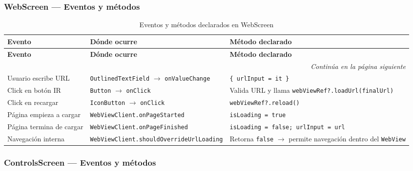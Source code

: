 \documentclass[stu, 12pt, letterpaper, donotrepeattitle, floatsintext, natbib]{apa7}
\begin{document}
\subsubsection{WebScreen --- Eventos y métodos}

\begin{longtable}{@{}p{2.8cm}p{3.7cm}p{9cm}@{}}
\caption{Eventos y métodos declarados en WebScreen}
\label{tab:evweb}\\
\toprule
\textbf{Evento} & \textbf{Dónde ocurre} & \textbf{Método declarado} \\
\midrule
\endfirsthead
\toprule
\textbf{Evento} & \textbf{Dónde ocurre} & \textbf{Método declarado} \\
\midrule
\endhead
\midrule
\multicolumn{3}{r}{\small\textit{Continúa en la página siguiente}}\\
\endfoot
\bottomrule
\endlastfoot
Usuario escribe URL & \texttt{OutlinedTextField} $\rightarrow$ \texttt{onValueChange} & \texttt{\{ urlInput = it \}} \\[3pt]
Click en botón IR & \texttt{Button} $\rightarrow$ \texttt{onClick} & Valida URL y llama \texttt{webViewRef?.loadUrl(finalUrl)} \\[3pt]
Click en recargar & \texttt{IconButton} $\rightarrow$ \texttt{onClick} & \texttt{webViewRef?.reload()} \\[3pt]
Página empieza a cargar & \texttt{WebViewClient.onPageStarted} & \texttt{isLoading = true} \\[3pt]
Página termina de cargar & \texttt{WebViewClient.onPageFinished} & \texttt{isLoading = false; urlInput = url} \\[3pt]
Navegación interna & \texttt{WebViewClient.shouldOverrideUrlLoading} & Retorna \texttt{false} $\rightarrow$ permite navegación dentro del \texttt{WebView} \\
\end{longtable}

\subsubsection{ControlsScreen --- Eventos y métodos}
\end{document}
